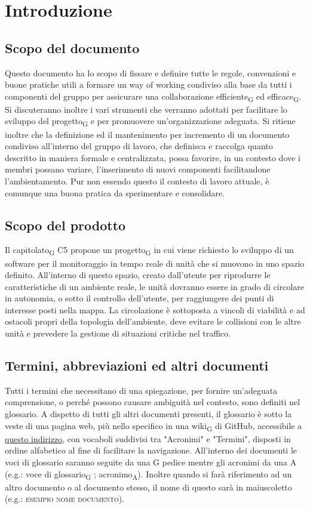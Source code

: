 \section{Introduzione}
\subsection{Scopo del documento}
    Questo documento ha lo scopo di fissare e definire tutte le regole, convenzioni e buone pratiche utili a formare un way of working condiviso alla base da tutti i componenti del gruppo per assicurare una collaborazione efficiente\textsubscript{G} ed efficace\textsubscript{G}. Si discuteranno inoltre i vari strumenti che verranno adottati per facilitare lo sviluppo del progetto\textsubscript{G} e per promuovere un'organizzazione adeguata.
    Si ritiene inoltre che la definizione ed il mantenimento per incremento di un documento condiviso all'interno del gruppo di lavoro, che definisca e raccolga quanto descritto in maniera formale e centralizzata, possa favorire, in un contesto dove i membri possano variare, l'inserimento di nuovi componenti facilitandone l'ambientamento. Pur non essendo questo il contesto di lavoro attuale, è comunque una buona pratica da sperimentare e consolidare.

\subsection{Scopo del prodotto}
Il capitolato\textsubscript{G} C5 propone un progetto\textsubscript{G} in cui viene richiesto lo sviluppo di un software per il monitoraggio in tempo reale di unità che si muovono in uno spazio definito. All'interno di questo spazio, creato dall'utente per riprodurre le caratteristiche di un ambiente reale, le unità dovranno essere in grado di circolare in autonomia, o sotto il controllo dell'utente, per raggiungere dei punti di interesse posti nella mappa.  La circolazione è sottoposta a vincoli di viabilità e ad ostacoli propri della topologia dell'ambiente, deve evitare le collisioni con le altre unità e prevedere la gestione di situazioni critiche nel traffico.

\subsection{Termini, abbreviazioni ed altri documenti}
    Tutti i termini che necessitano di una spiegazione, per fornire un'adeguata comprensione, o perché possono causare ambiguità nel contesto, sono definiti nel glossario. A dispetto di tutti gli altri documenti presenti, il glossario è sotto la veste di una pagina web, più nello specifico in una wiki\textsubscript{G} di GitHub, accessibile a \href{https://github.com/Three-Way-Milkshake/docs/wiki/Glossario}{questo indirizzo}, con vocaboli suddivisi tra "Acronimi" e "Termini", disposti in ordine alfabetico al fine di facilitare la navigazione. All'interno dei documenti le voci di glossario saranno seguite da una G pedice mentre gli acronimi da una A (e.g.: voce di glossario\textsubscript{G} ; acronimo\textsubscript{A}).
    Inoltre quando si farà riferimento ad un altro documento o al documento stesso, il nome di questo sarà in maiuscoletto (e.g.: \textsc{esempio nome documento}).

